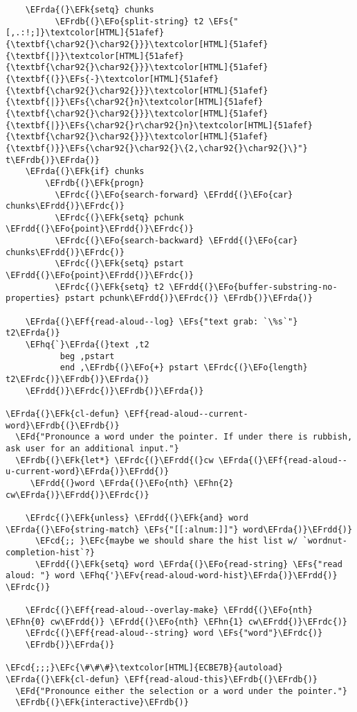 \documentclass[a4wide,10pt]{article}
\newcommand{\EFc}[1]{\textcolor{EFc}{#1}} %
\newcommand{\EFcd}[1]{\textcolor{EFcd}{#1}} %
\newcommand{\EFs}[1]{\textcolor{EFs}{#1}} %
\newcommand{\EFd}[1]{\textcolor{EFd}{#1}} %
\newcommand{\EFk}[1]{\textcolor{EFk}{#1}} %
\newcommand{\EFf}[1]{\textcolor{EFf}{#1}} %
\newcommand{\EFv}[1]{\textcolor{EFv}{#1}} %
\newcommand{\EFo}[1]{\textcolor{EFo}{#1}} %
\newcommand{\EFhn}[1]{\textcolor{EFhn}{\textbf{#1}}} %
\newcommand{\EFhq}[1]{\textcolor{EFhq}{#1}} %
\newcommand{\EFrda}[1]{\textcolor{EFrda}{#1}} %
\newcommand{\EFrdb}[1]{\textcolor{EFrdb}{#1}} %
\newcommand{\EFrdc}[1]{\textcolor{EFrdc}{#1}} %
\newcommand{\EFrdd}[1]{\textcolor{EFrdd}{#1}} %
\begin{document}
\begin{Code}
\begin{Verbatim}
	\EFrda{(}\EFk{setq} chunks
	      \EFrdb{(}\EFo{split-string} t2 \EFs{"[,.:!;]}\textcolor[HTML]{51afef}{\textbf{\char92{}\char92{}}}\textcolor[HTML]{51afef}{\textbf{|}}\textcolor[HTML]{51afef}{\textbf{\char92{}\char92{}}}\textcolor[HTML]{51afef}{\textbf{(}}\EFs{-}\textcolor[HTML]{51afef}{\textbf{\char92{}\char92{}}}\textcolor[HTML]{51afef}{\textbf{|}}\EFs{\char92{}n}\textcolor[HTML]{51afef}{\textbf{\char92{}\char92{}}}\textcolor[HTML]{51afef}{\textbf{|}}\EFs{\char92{}r\char92{}n}\textcolor[HTML]{51afef}{\textbf{\char92{}\char92{}}}\textcolor[HTML]{51afef}{\textbf{)}}\EFs{\char92{}\char92{}\{2,\char92{}\char92{}\}"} t\EFrdb{)}\EFrda{)}
	\EFrda{(}\EFk{if} chunks
	    \EFrdb{(}\EFk{progn}
	      \EFrdc{(}\EFo{search-forward} \EFrdd{(}\EFo{car} chunks\EFrdd{)}\EFrdc{)}
	      \EFrdc{(}\EFk{setq} pchunk \EFrdd{(}\EFo{point}\EFrdd{)}\EFrdc{)}
	      \EFrdc{(}\EFo{search-backward} \EFrdd{(}\EFo{car} chunks\EFrdd{)}\EFrdc{)}
	      \EFrdc{(}\EFk{setq} pstart \EFrdd{(}\EFo{point}\EFrdd{)}\EFrdc{)}
	      \EFrdc{(}\EFk{setq} t2 \EFrdd{(}\EFo{buffer-substring-no-properties} pstart pchunk\EFrdd{)}\EFrdc{)} \EFrdb{)}\EFrda{)}

	\EFrda{(}\EFf{read-aloud--log} \EFs{"text grab: `\%s`"} t2\EFrda{)}
	\EFhq{`}\EFrda{(}text ,t2
	       beg ,pstart
	       end ,\EFrdb{(}\EFo{+} pstart \EFrdc{(}\EFo{length} t2\EFrdc{)}\EFrdb{)}\EFrda{)}
	\EFrdd{)}\EFrdc{)}\EFrdb{)}\EFrda{)}

\EFrda{(}\EFk{cl-defun} \EFf{read-aloud--current-word}\EFrdb{(}\EFrdb{)}
  \EFd{"Pronounce a word under the pointer. If under there is rubbish,
ask user for an additional input."}
  \EFrdb{(}\EFk{let*} \EFrdc{(}\EFrdd{(}cw \EFrda{(}\EFf{read-aloud--u-current-word}\EFrda{)}\EFrdd{)}
	 \EFrdd{(}word \EFrda{(}\EFo{nth} \EFhn{2} cw\EFrda{)}\EFrdd{)}\EFrdc{)}

    \EFrdc{(}\EFk{unless} \EFrdd{(}\EFk{and} word \EFrda{(}\EFo{string-match} \EFs{"[[:alnum:]]"} word\EFrda{)}\EFrdd{)}
      \EFcd{;; }\EFc{maybe we should share the hist list w/ `wordnut-completion-hist`?}
      \EFrdd{(}\EFk{setq} word \EFrda{(}\EFo{read-string} \EFs{"read aloud: "} word \EFhq{'}\EFv{read-aloud-word-hist}\EFrda{)}\EFrdd{)} \EFrdc{)}

    \EFrdc{(}\EFf{read-aloud--overlay-make} \EFrdd{(}\EFo{nth} \EFhn{0} cw\EFrdd{)} \EFrdd{(}\EFo{nth} \EFhn{1} cw\EFrdd{)}\EFrdc{)}
    \EFrdc{(}\EFf{read-aloud--string} word \EFs{"word"}\EFrdc{)}
    \EFrdb{)}\EFrda{)}

\EFcd{;;;}\EFc{\#\#\#}\textcolor[HTML]{ECBE7B}{autoload}
\EFrda{(}\EFk{cl-defun} \EFf{read-aloud-this}\EFrdb{(}\EFrdb{)}
  \EFd{"Pronounce either the selection or a word under the pointer."}
  \EFrdb{(}\EFk{interactive}\EFrdb{)}


\end{Verbatim}
\end{Code}
\end{document}
